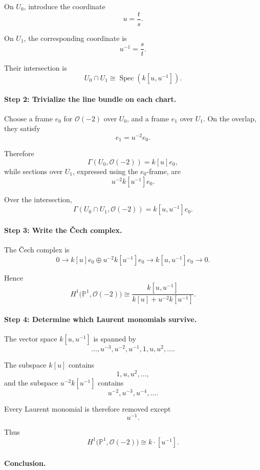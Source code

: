 \documentclass[12pt,a4paper]{article}
\theoremstyle{notespace}
\begin{document}
On \(U_{0}\), introduce the coordinate
\[
u=\frac{t}{s}.
\]

On \(U_{1}\), the corresponding coordinate is
\[
u^{-1}=\frac{s}{t}.
\]

Their intersection is
\[
U_{0}\cap U_{1}
\cong
\operatorname{Spec}(k[u,u^{-1}]).
\]

\paragraph{Step 2: Trivialize the line bundle on each chart.}

Choose a frame \(e_{0}\) for \(\mathcal{O}(-2)\) over \(U_{0}\), and a
frame \(e_{1}\) over \(U_{1}\). On the overlap, they satisfy
\[
e_{1}=u^{-2}e_{0}.
\]

Therefore
\[
\Gamma(U_{0},\mathcal{O}(-2))
=
k[u]e_{0},
\]
while sections over \(U_{1}\), expressed using the \(e_{0}\)-frame, are
\[
u^{-2}k[u^{-1}]e_{0}.
\]

Over the intersection,
\[
\Gamma(U_{0}\cap U_{1},\mathcal{O}(-2))
=
k[u,u^{-1}]e_{0}.
\]

\paragraph{Step 3: Write the Čech complex.}

The Čech complex is
\[
0
\longrightarrow
k[u]e_{0}
\oplus
u^{-2}k[u^{-1}]e_{0}
\longrightarrow
k[u,u^{-1}]e_{0}
\longrightarrow
0.
\]

Hence
\[
H^{1}\bigl(\mathbb{P}^{1},\mathcal{O}(-2)\bigr)
\cong
\frac{k[u,u^{-1}]}
{k[u]+u^{-2}k[u^{-1}]}.
\]

\paragraph{Step 4: Determine which Laurent monomials survive.}

The vector space \(k[u,u^{-1}]\) is spanned by
\[
\ldots,u^{-3},u^{-2},u^{-1},1,u,u^{2},\ldots.
\]

The subspace \(k[u]\) contains
\[
1,u,u^{2},\ldots,
\]
and the subspace \(u^{-2}k[u^{-1}]\) contains
\[
u^{-2},u^{-3},u^{-4},\ldots.
\]

Every Laurent monomial is therefore removed except
\[
u^{-1}.
\]

Thus
\[
H^{1}\bigl(\mathbb{P}^{1},\mathcal{O}(-2)\bigr)
\cong
k\cdot [u^{-1}].
\]

\paragraph{Conclusion.}
\end{document}
